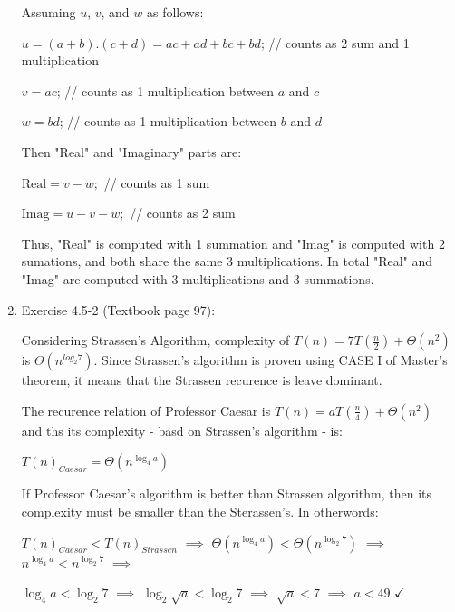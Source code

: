 \documentclass[11pt]{article}
\begin{document}
\begin{enumerate}
	Assuming $u$, $v$, and $w$ as follows: 
	
	\hspace{10mm} $ u = (a+b).(c+d)=ac+ad+bc+bd$;  // counts as 2 sum and 1 multiplication 
	
	\hspace{10mm} $ v = ac$;  // counts as 1 multiplication between $a$ and $c$
		
	\hspace{10mm} $ w = bd$;  // counts as 1 multiplication between $b$ and $d$
	
	Then "Real" and "Imaginary" parts are:
	
	\hspace{10mm} $\mathrm{Real} = v-w;$  // counts as 1 sum   
		
	\hspace{10mm} $\mathrm{Imag} = u-v-w;$  // counts as 2 sum 
	
	Thus, "Real" is computed with 1 summation and "Imag" is computed with 2 sumations, and both share the same 3 multiplications. In total "Real" and "Imag" are computed with 3 multiplications and 3 summations.
	
	
	
	
	


\item Exercise 4.5-2 (Textbook page 97): 

	Considering Strassen's Algorithm, complexity of $T(n)=7T(\frac{n}{2})+\Theta(n^{2})$ is $\Theta(n^{log_2{7}})$. Since Strassen's algorithm is proven using CASE I of Master's theorem, it means that the Strassen recurence is leave dominant. 
	
	The recurence relation of Professor Caesar is $T(n)=aT(\frac{n}{4})+\Theta(n^{2})$ and ths its complexity - basd on Strassen's algorithm - is: 
	
	\hspace{10mm} $T(n)_{Caesar} = \Theta(n^{\log_4{a}})$	
	
	If Professor Caesar's algorithm is better than Strassen algorithm, then its complexity must be smaller than the Sterassen's. In otherwords:
	
	\hspace{10mm} $T(n)_{Caesar} < T(n)_{Strassen}$
	$\overset{\mathrm{}}{\implies}$
	$\Theta(n^{\log_4{a}}) < \Theta(n^{\log_2{7}})$
	$\overset{\mathrm{}}{\implies}$
	$n^{\log_4{a}} < n^{\log_2{7}}$
	$\overset{\mathrm{}}{\implies}$
	
	\hspace{10mm} $\log_4{a} < \log_2{7}$
	$\overset{\mathrm{}}{\implies}$
	$\log_2{\sqrt{a}} < \log_2{7}$
	$\overset{\mathrm{}}{\implies}$
	$\sqrt{a}<7$
	$\overset{\mathrm{}}{\implies}$
	$a<49$
	$\checkmark$
	

\end{enumerate}
\end{document}
